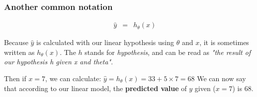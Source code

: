 \subsubsection*{Another common notation}

$$
\begin{matrix} & & \hat{y} & = & h_{\theta}(x)\end{matrix}
$$

Because $\hat{y}$ is calculated with our linear hypothesis using $\theta$ and $x$, it is sometimes written as $h_{\theta}(x)$.
The $h$ stands for \textit{hypothesis}, and can be read as \textit{"the result of our hypothesis h given x and theta"}.

Then if $x = 7$, we can calculate:
$\hat{y} = h_{\theta}(x) = 33 + 5 \times 7 = 68$
We can now say that according to our linear model, the \textbf{predicted value} of $y$ given ($x = 7$) is 68.

